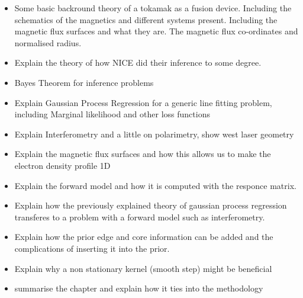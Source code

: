 
\begin{itemize}
    \item Some basic backround theory of a tokamak as a fusion device. Including the schematics of the magnetics and different systems present. Including the magnetic flux surfaces and what they are. The magnetic flux co-ordinates and normalised radius. 
    \item Explain the theory of how NICE did their inference to some degree.
    \item Bayes Theorem for inference problems
    \item Explain Gaussian Process Regression for a generic line fitting problem, including Marginal likelihood and other loss functions
    \item Explain Interferometry and a little on polarimetry, show west laser geometry
    \item Explain the magnetic flux surfaces and how this allows us to make the electron density profile 1D
    \item Explain the forward model and how it is computed with the responce matrix.
    \item Explain how the previously explained theory of gaussian process regression transferes to a problem with a forward model such as interferometry.
    \item Explain how the prior edge and core information can be added and the complications of inserting it into the prior.
    \item Explain why a non stationary kernel (smooth step) might be beneficial 
    \item summarise the chapter and explain how it ties into the methodology
\end{itemize}





